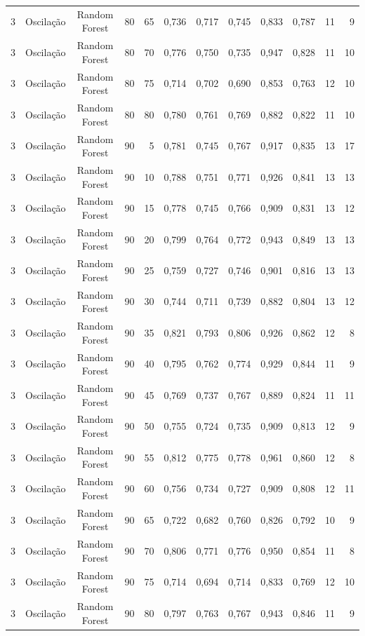\begin{longtable}{ccclrrrrrrrr}
3 & Oscilação & Random Forest & 80 & 65 & 0,736 & 0,717 & 0,745 & 0,833 & 0,787 & 11 & 9 \\
3 & Oscilação & Random Forest & 80 & 70 & 0,776 & 0,750 & 0,735 & 0,947 & 0,828 & 11 & 10 \\
3 & Oscilação & Random Forest & 80 & 75 & 0,714 & 0,702 & 0,690 & 0,853 & 0,763 & 12 & 10 \\
3 & Oscilação & Random Forest & 80 & 80 & 0,780 & 0,761 & 0,769 & 0,882 & 0,822 & 11 & 10 \\
3 & Oscilação & Random Forest & 90 & 5 & 0,781 & 0,745 & 0,767 & 0,917 & 0,835 & 13 & 17 \\
3 & Oscilação & Random Forest & 90 & 10 & 0,788 & 0,751 & 0,771 & 0,926 & 0,841 & 13 & 13 \\
3 & Oscilação & Random Forest & 90 & 15 & 0,778 & 0,745 & 0,766 & 0,909 & 0,831 & 13 & 12 \\
3 & Oscilação & Random Forest & 90 & 20 & 0,799 & 0,764 & 0,772 & 0,943 & 0,849 & 13 & 13 \\
3 & Oscilação & Random Forest & 90 & 25 & 0,759 & 0,727 & 0,746 & 0,901 & 0,816 & 13 & 13 \\
3 & Oscilação & Random Forest & 90 & 30 & 0,744 & 0,711 & 0,739 & 0,882 & 0,804 & 13 & 12 \\
3 & Oscilação & Random Forest & 90 & 35 & 0,821 & 0,793 & 0,806 & 0,926 & 0,862 & 12 & 8 \\
3 & Oscilação & Random Forest & 90 & 40 & 0,795 & 0,762 & 0,774 & 0,929 & 0,844 & 11 & 9 \\
3 & Oscilação & Random Forest & 90 & 45 & 0,769 & 0,737 & 0,767 & 0,889 & 0,824 & 11 & 11 \\
3 & Oscilação & Random Forest & 90 & 50 & 0,755 & 0,724 & 0,735 & 0,909 & 0,813 & 12 & 9 \\
3 & Oscilação & Random Forest & 90 & 55 & 0,812 & 0,775 & 0,778 & 0,961 & 0,860 & 12 & 8 \\
3 & Oscilação & Random Forest & 90 & 60 & 0,756 & 0,734 & 0,727 & 0,909 & 0,808 & 12 & 11 \\
3 & Oscilação & Random Forest & 90 & 65 & 0,722 & 0,682 & 0,760 & 0,826 & 0,792 & 10 & 9 \\
3 & Oscilação & Random Forest & 90 & 70 & 0,806 & 0,771 & 0,776 & 0,950 & 0,854 & 11 & 8 \\
3 & Oscilação & Random Forest & 90 & 75 & 0,714 & 0,694 & 0,714 & 0,833 & 0,769 & 12 & 10 \\
3 & Oscilação & Random Forest & 90 & 80 & 0,797 & 0,763 & 0,767 & 0,943 & 0,846 & 11 & 9 \\

\end{longtable}
